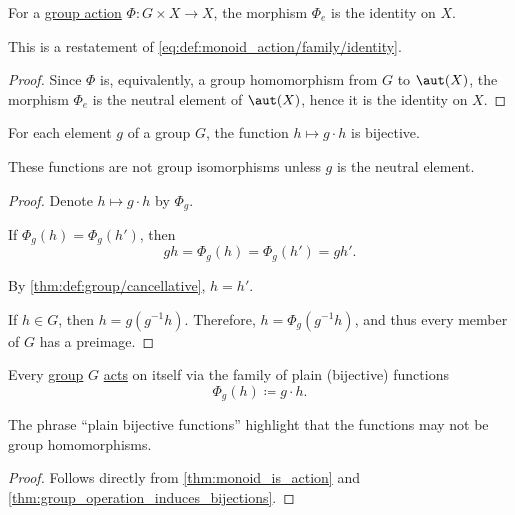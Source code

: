 \begin{proposition}\label{thm:group_action_of_neutral_element}
  For a \hyperref[def:group_action]{group action} \( \Phi: G \times X \to X \), the morphism \( \Phi_e \) is the identity on \( X \).
\end{proposition}
\begin{comments}
  \item This is a restatement of \eqref{eq:def:monoid_action/family/identity}.
\end{comments}
\begin{proof}
  Since \( \Phi \) is, equivalently, a group homomorphism from \( G \) to \( \aut(X) \), the morphism \( \Phi_e \) is the neutral element of \( \aut(X) \), hence it is the identity on \( X \).
\end{proof}

\begin{lemma}\label{thm:group_operation_induces_bijections}
  For each element \( g \) of a group \( G \), the function \( h \mapsto g \cdot h \) is bijective.
\end{lemma}
\begin{comments}
  \item These functions are not group isomorphisms unless \( g \) is the neutral element.
\end{comments}
\begin{proof}
  Denote \( h \mapsto g \cdot h \) by \( \Phi_g \).

   If \( \Phi_g(h) = \Phi_g(h') \), then
  \begin{equation*}
    gh = \Phi_g(h) = \Phi_g(h') = gh'.
  \end{equation*}

  By \cref{thm:def:group/cancellative}, \( h = h' \).

   If \( h \in G \), then \( h = g(g^{-1} h) \). Therefore, \( h = \Phi_g(g^{-1} h) \), and thus every member of \( G \) has a preimage.
\end{proof}

\begin{proposition}\label{thm:group_is_action}
  Every \hyperref[def:group]{group} \( G \) \hyperref[def:group_action]{acts} on itself via the family of plain (bijective) functions
  \begin{equation*}
    \Phi_g(h) \coloneqq g \cdot h.
  \end{equation*}
\end{proposition}
\begin{comments}
  \item The phrase \enquote{plain bijective functions} highlight that the functions may not be group homomorphisms.
\end{comments}
\begin{proof}
  Follows directly from \cref{thm:monoid_is_action} and \cref{thm:group_operation_induces_bijections}.
\end{proof}

